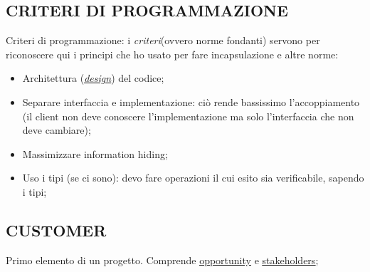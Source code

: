 		\subsection{CRITERI DI PROGRAMMAZIONE}		\label{criteriprog}
		Criteri di programmazione: %
		i \textit{criteri}(ovvero norme fondanti) servono per riconoscere qui i principi che ho usato per fare incapsulazione e altre norme: 
		\begin{itemize}
			\item Architettura (\textit{\underline{\hyperref[progettazione]{design}}}) del codice;
			\item Separare interfaccia e implementazione: ciò rende bassissimo l'accoppiamento (il client non deve conoscere l'implementazione ma solo l'interfaccia che non deve cambiare);
			\item Massimizzare information hiding;
			\item Uso i tipi (se ci sono): devo fare operazioni il cui esito sia verificabile, sapendo i tipi;
		\end{itemize}	
		
		
		\subsection{CUSTOMER}  \label{customer}
		Primo elemento di un progetto. Comprende \underline{\hyperref[opportunity]{opportunity}} e \underline{\hyperref[stakeholder]{stakeholders}}; 
	
	
